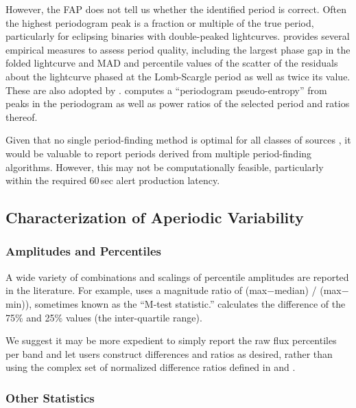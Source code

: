 \documentclass[DM,authoryear,toc]{lsstdoc}
\begin{document}
However, the FAP does not tell us whether the identified period is correct.
Often the highest periodogram peak is a fraction or multiple of the true period, particularly for eclipsing binaries with double-peaked lightcurves.
\citet{Dubath:11:VariableClassification} provides several empirical measures to assess period quality, including the largest phase gap in the folded lightcurve and MAD and percentile values of the scatter of the residuals about the lightcurve phased at the Lomb-Scargle period as well as twice its value.
These are also adopted by \citep{Richards:12:ASASCatalog}.
\citet{Sanchez-Saez:21:AlertClassification} computes a ``periodogram pseudo-entropy'' from peaks in the periodogram as well as power ratios of the selected period and ratios thereof.


Given that no single period-finding method is optimal for all classes of sources \citep{Graham:13:PeriodFindingComparison}, it would be valuable to report periods derived from multiple period-finding algorithms.
However, this may not be computationally feasible, particularly within the required 60\,sec alert production latency.



\subsection{Characterization of Aperiodic Variability}

\subsubsection{Amplitudes and Percentiles}

A wide variety of combinations and scalings of percentile amplitudes are reported in the literature.
For example, \citet{Kinemuchi:06:RRLyrNSVS} uses a magnitude ratio of (max$-$median) / (max$-$min)), sometimes known as the ``M-test statistic.''
\citet{Kim:16:UPSILoN} calculates the difference of the 75\% and 25\% values (the inter-quartile range).


We suggest it may be more expedient to simply report the raw flux percentiles per band and let users construct differences and ratios as desired, rather than using the complex set of normalized difference ratios defined in \citet{2011ApJ...733...10R} and .

\subsubsection{Other Statistics} \label{sec:other-stats}
\end{document}

